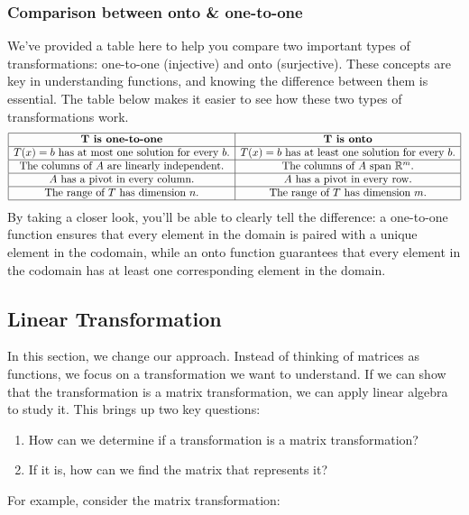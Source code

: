 \documentclass[a4paper,12pt]{article}
\begin{document}
\subsubsection{Comparison between onto \& one-to-one}
We’ve provided a table here to help you compare two important types of transformations: one-to-one (injective) and onto (surjective). These concepts are key in understanding functions, and knowing the difference between them is essential. The table below makes it easier to see how these two types of transformations work.
\[
\begin{array}{|c|c|}
\hline
\textbf{T is one-to-one} & \textbf{T is onto} \\
\hline
T(x) = b \text{ has at most one solution for every } b. & T(x) = b \text{ has at least one solution for every } b. \\
\hline
\text{The columns of } A \text{ are linearly independent.} & \text{The columns of } A \text{ span } \mathbb{R}^m. \\
\hline
A \text{ has a pivot in every column.} & A \text{ has a pivot in every row.} \\
\hline
\text{The range of } T \text{ has dimension } n. & \text{The range of } T \text{ has dimension } m. \\
\hline
\end{array}
\]
By taking a closer look, you'll be able to clearly tell the difference: a one-to-one function ensures that every element in the domain is paired with a unique element in the codomain, while an onto function guarantees that every element in the codomain has at least one corresponding element in the domain.
\subsection{Linear Transformation}
In this section, we change our approach. Instead of thinking of matrices as functions, we focus on a transformation we want to understand. If we can show that the transformation is a matrix transformation, we can apply linear algebra to study it. This brings up two key questions:
\begin{enumerate}
    \item How can we determine if a transformation is a matrix transformation?
    \item If it is, how can we find the matrix that represents it?
\end{enumerate}

For example, consider the matrix transformation:
\end{document}
